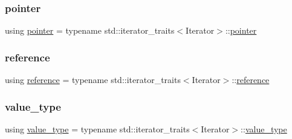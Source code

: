 \subsubsection{\texorpdfstring{pointer}{pointer}}
{\footnotesize\ttfamily using \mbox{\hyperlink{classstanfordcpplib_1_1collections_1_1CheckedIterator_aec43e3dd6c5819f52268692c4f174d89}{pointer}} =  typename std\+::iterator\+\_\+traits$<$Iterator$>$\+::\mbox{\hyperlink{classstanfordcpplib_1_1collections_1_1CheckedIterator_aec43e3dd6c5819f52268692c4f174d89}{pointer}}}

\mbox{\label{classstanfordcpplib_1_1collections_1_1CheckedIterator_a57d818f6bd24dee2a8803cb3be635373}} 
\subsubsection{\texorpdfstring{reference}{reference}}
{\footnotesize\ttfamily using \mbox{\hyperlink{classstanfordcpplib_1_1collections_1_1CheckedIterator_a57d818f6bd24dee2a8803cb3be635373}{reference}} =  typename std\+::iterator\+\_\+traits$<$Iterator$>$\+::\mbox{\hyperlink{classstanfordcpplib_1_1collections_1_1CheckedIterator_a57d818f6bd24dee2a8803cb3be635373}{reference}}}

\mbox{\label{classstanfordcpplib_1_1collections_1_1CheckedIterator_ae7f303a443fbf651b13f8289d05ef498}} 
\subsubsection{\texorpdfstring{value\+\_\+type}{value\_type}}
{\footnotesize\ttfamily using \mbox{\hyperlink{classstanfordcpplib_1_1collections_1_1CheckedIterator_ae7f303a443fbf651b13f8289d05ef498}{value\+\_\+type}} =  typename std\+::iterator\+\_\+traits$<$Iterator$>$\+::\mbox{\hyperlink{classstanfordcpplib_1_1collections_1_1CheckedIterator_ae7f303a443fbf651b13f8289d05ef498}{value\+\_\+type}}}



